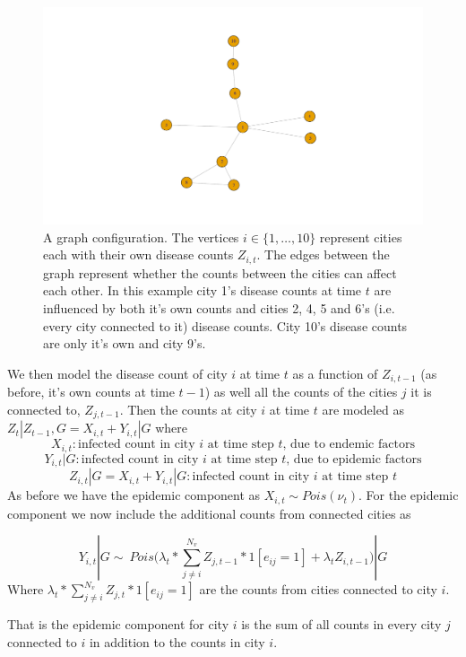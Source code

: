 \documentclass[]{article}
\numberwithin{equation}{section}
\begin{document}
\begin{figure}
\includegraphics[trim={1 2cm 0 2cm},clip]{thesis_draft_files/figure-latex/unnamed-chunk-1-1} \caption{\label{fig:graph example} A graph configuration. The vertices $i \in \{1,\dots, 10\}$ represent cities each with their own disease counts          $Z_{i,t}$. The edges between the graph represent whether the counts between the cities can affect each other. In this example city 1's disease counts at time $t$ are influenced by both it's own counts and cities 2, 4, 5 and 6's (i.e. every city connected to it) disease counts. City 10's disease counts are only it's own and city 9's.}\label{fig:unnamed-chunk-1}
\end{figure}

We then model the disease count of city \(i\) at time \(t\) as a
function of \(Z_{i,t-1}\) (as before, it's own counts at time \(t-1\))
as well all the counts of the cities \(j\) it is connected to,
\(Z_{j,t-1}\). Then the counts at city \(i\) at time \(t\) are modeled
as \(Z_t|Z_{t-1}, G = X_{i, t} + Y_{i,t}|G\) where
\[X_{i,t}: \text{infected count in city } i \text{ at time step } t \text{, due to endemic factors}   \]
\[Y_{i,t}|G : \text{infected count in city } i \text{ at time step } t \text{, due to epidemic factors}\]
\[Z_{i,t}|G = X_{i,t} + Y_{i,t}|G: \text{infected count in city } i \text{ at time step } t \]
As before we have the epidemic component as
\(X_{i,t} \sim Pois(\nu_t)\). For the epidemic component we now include
the additional counts from connected cities as

\[Y_{i,t}|G \sim ~ Pois\big(\lambda_t*\sum_{j\neq i}^{N_v}Z_{j,t-1}*1[e_{ij}=1]+ \lambda_tZ_{i,t-1}\big)|G \]
Where \(\lambda_t*\sum_{j\neq i}^{N_v}Z_{j,t}*1[e_{ij}=1]\) are the
counts from cities connected to city \(i\).

That is the epidemic component for city \(i\) is the sum of all counts
in every city \(j\) connected to \(i\) in addition to the counts in city
\(i\).
\end{document}
